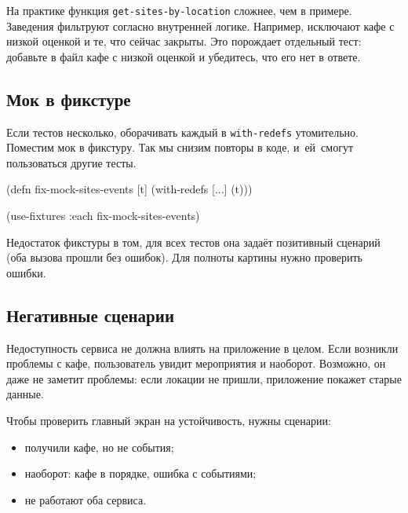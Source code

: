 На практике функция \verb|get-sites-by-location| сложнее, чем в
примере. Заведения фильтруют согласно внутренней логике. Например, исключают
кафе с низкой оценкой и те, что сейчас закрыты. Это порождает отдельный тест:
добавьте в файл кафе с низкой оценкой и убедитесь, что его нет в ответе.

\subsection{Мок в фикстуре}


Если тестов несколько, оборачивать каждый в \verb|with-redefs|
утомительно. Поместим мок в фикстуру. Так мы снизим повторы в коде, и~ей~смогут
пользоваться другие тесты.

\begin{english}
  \begin{clojure}
(defn fix-mock-sites-events [t]
  (with-redefs [...]
    (t)))

(use-fixtures :each fix-mock-sites-events)
  \end{clojure}
\end{english}

Недостаток фикстуры в том, для всех тестов она задаёт позитивный сценарий (оба
вызова прошли без ошибок). Для полноты картины нужно проверить ошибки.

\subsection{Негативные сценарии}


Недоступность сервиса не должна влиять на приложение в целом. Если возникли
проблемы с кафе, пользователь увидит мероприятия и наоборот. Возможно, он даже
не заметит проблемы: если локации не пришли, приложение покажет старые данные.

Чтобы проверить главный экран на устойчивость, нужны сценарии:

\begin{itemize}

\item
  получили кафе, но не события;

\item
  наоборот: кафе в порядке, ошибка с событиями;

\item
  не работают оба сервиса.

\end{itemize}

